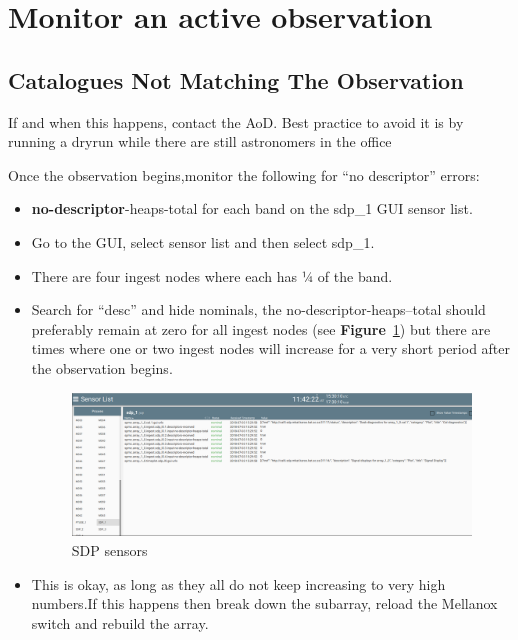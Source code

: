          




\section{ Monitor an active observation}
\subsection{Catalogues Not Matching The Observation}
If and when this happens, contact the AoD. Best practice to avoid it is by running a dryrun while there are still astronomers in the office

Once the observation begins,monitor the following for “no descriptor” errors:
\begin{itemize}

\item \textbf{no-descriptor}-heaps-total for each band on the sdp\_1 GUI sensor list. 
\item Go to the GUI, select sensor list and then select sdp\_1.
\item There are four ingest nodes where each has ¼ of the band.
\item Search for “desc” and hide nominals, the no-descriptor-heaps--total should preferably remain at zero for all ingest nodes (see \textbf{Figure}~\ref{fig:image129}) but there are times where one or two ingest nodes will increase for a very short period after the observation begins.

\begin{figure}[!thb]
	\centering
	\includegraphics[scale=0.26]{Chapters/images/image129.png}
	
	\caption{SDP sensors}
	\label{fig:image129}
\end{figure}
\item This is okay, as long as they all do not keep increasing to very high numbers.If this happens then break down the subarray, reload the Mellanox switch and rebuild the array.
	





\end{itemize}
